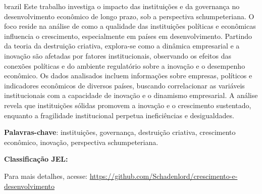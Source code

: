 \documentclass[
	article,
	12pt,
	oneside,
	a4paper,
	english,
	brazil, %
	sumario=tradicional
]{abntex2}
\begin{document}
\renewcommand{\resumoname}{Resumo}
\begin{resumoumacoluna}
\begin{otherlanguage*}{brazil}
    \noindent 
    Este trabalho investiga o impacto das instituições e da governança no desenvolvimento econômico de longo prazo, sob a perspectiva schumpeteriana. O foco reside na análise de como a qualidade das instituições políticas e econômicas influencia o crescimento, especialmente em países em desenvolvimento. Partindo da teoria da destruição criativa, explora-se como a dinâmica empresarial e a inovação são afetadas por fatores institucionais, observando os efeitos das conexões políticas e do ambiente regulatório sobre a inovação e o desempenho econômico. Os dados analisados incluem informações sobre empresas, políticos e indicadores econômicos de diversos países, buscando correlacionar as variáveis institucionais com a capacidade de inovação e o dinamismo empresarial. A análise revela que instituições sólidas promovem a inovação e o crescimento sustentado, enquanto a fragilidade institucional perpetua ineficiências e desigualdades.
    
    \textbf{Palavras-chave}: instituições, governança, destruição criativa, crescimento econômico, inovação, perspectiva schumpeteriana.
    
    \textbf{Classificação JEL:}

	   Para mais detalhes, acesse: \url{https://github.com/Schadenlord/crescimento-e-desenvolvimento}

 \end{otherlanguage*}  
\end{resumoumacoluna}

\newpage


\textual



\renewcommand{\refname}{Referências}


\end{document}
